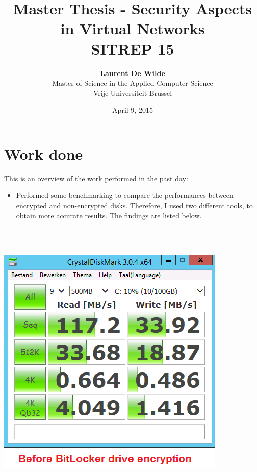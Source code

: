 \documentclass[11pt, a4paper]{article}
\title{Master Thesis -  Security Aspects in Virtual Networks\\ \textbf{SITREP 15}}
\author{\textbf{Laurent De Wilde} \\ Master of Science in the Applied Computer Science \\ Vrije Universiteit Brussel}
\date{April 9, 2015}
\begin{document}
\maketitle

\section*{Work done}

This is an overview of the work performed in the past day:
\begin{itemize}
\item Performed some benchmarking to compare the performances between encrypted and non-encrypted disks. Therefore, I used two different tools, to obtain more accurate results. The findings are listed below.
\end{itemize}
$\;$ \\ \\
\noindent\begin{minipage}{\textwidth}
    \centering
    \includegraphics{Pre_BitLocker_1.png}
\end{minipage}
$\;$ \\ \\
\end{document}
